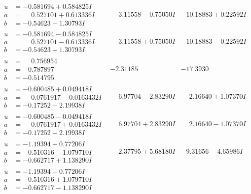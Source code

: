 \documentclass[1p]{elsarticle_modified}
\theoremstyle{definition}
\begin{document}
$$\begin{array}{c|c|c}
\begin{aligned}
u &= -0.581694 + 0.584825 I \\
a &= \phantom{-}0.527101 + 0.613336 I \\
b &= -0.54623 - 1.30793 I\end{aligned}
 & \phantom{-}3.11558 - 0.75050 I & -10.18883 + 0.22592 I \\ \hline\begin{aligned}
u &= -0.581694 - 0.584825 I \\
a &= \phantom{-}0.527101 - 0.613336 I \\
b &= -0.54623 + 1.30793 I\end{aligned}
 & \phantom{-}3.11558 + 0.75050 I & -10.18883 - 0.22592 I \\ \hline\begin{aligned}
u &= \phantom{-}0.756954\phantom{ +0.000000I} \\
a &= -0.787897\phantom{ +0.000000I} \\
b &= -0.514795\phantom{ +0.000000I}\end{aligned}
 & -2.31185\phantom{ +0.000000I} & -17.3930\phantom{ +0.000000I} \\ \hline\begin{aligned}
u &= -0.600485 + 0.049418 I \\
a &= \phantom{-}0.0761917 - 0.0163432 I \\
b &= -0.17252 - 2.19938 I\end{aligned}
 & \phantom{-}6.97704 - 2.83290 I & \phantom{-}2.16640 + 1.07370 I \\ \hline\begin{aligned}
u &= -0.600485 - 0.049418 I \\
a &= \phantom{-}0.0761917 + 0.0163432 I \\
b &= -0.17252 + 2.19938 I\end{aligned}
 & \phantom{-}6.97704 + 2.83290 I & \phantom{-}2.16640 - 1.07370 I \\ \hline\begin{aligned}
u &= -1.19394 + 0.77206 I \\
a &= -0.510316 - 1.079710 I \\
b &= -0.662717 + 1.138290 I\end{aligned}
 & \phantom{-}2.37795 + 5.68180 I & -9.31656 - 4.65986 I \\ \hline\begin{aligned}
u &= -1.19394 - 0.77206 I \\
a &= -0.510316 + 1.079710 I \\
b &= -0.662717 - 1.138290 I\end{aligned}

\end{array}$$
\end{document}
